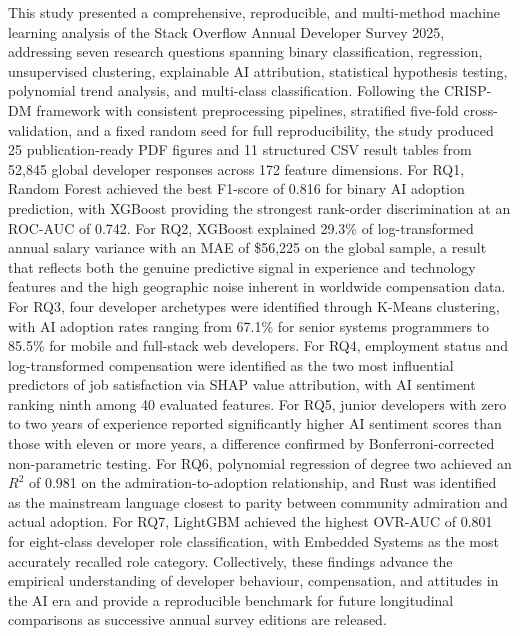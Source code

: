 \documentclass[journal, onecolumn]{IEEEtran}
\begin{document}
This study presented a comprehensive, reproducible, and multi-method machine learning analysis of the Stack Overflow Annual Developer Survey 2025, addressing seven research questions spanning binary classification, regression, unsupervised clustering, explainable AI attribution, statistical hypothesis testing, polynomial trend analysis, and multi-class classification.
Following the CRISP-DM framework with consistent preprocessing pipelines, stratified five-fold cross-validation, and a fixed random seed for full reproducibility, the study produced 25 publication-ready PDF figures and 11 structured CSV result tables from 52,845 global developer responses across 172 feature dimensions.
For RQ1, Random Forest achieved the best F1-score of 0.816 for binary AI adoption prediction, with XGBoost providing the strongest rank-order discrimination at an ROC-AUC of 0.742.
For RQ2, XGBoost explained 29.3\% of log-transformed annual salary variance with an MAE of \$56,225 on the global sample, a result that reflects both the genuine predictive signal in experience and technology features and the high geographic noise inherent in worldwide compensation data.
For RQ3, four developer archetypes were identified through K-Means clustering, with AI adoption rates ranging from 67.1\% for senior systems programmers to 85.5\% for mobile and full-stack web developers.
For RQ4, employment status and log-transformed compensation were identified as the two most influential predictors of job satisfaction via SHAP value attribution, with AI sentiment ranking ninth among 40 evaluated features.
For RQ5, junior developers with zero to two years of experience reported significantly higher AI sentiment scores than those with eleven or more years, a difference confirmed by Bonferroni-corrected non-parametric testing.
For RQ6, polynomial regression of degree two achieved an $R^2$ of 0.981 on the admiration-to-adoption relationship, and Rust was identified as the mainstream language closest to parity between community admiration and actual adoption.
For RQ7, LightGBM achieved the highest OVR-AUC of 0.801 for eight-class developer role classification, with Embedded Systems as the most accurately recalled role category.
Collectively, these findings advance the empirical understanding of developer behaviour, compensation, and attitudes in the AI era and provide a reproducible benchmark for future longitudinal comparisons as successive annual survey editions are released.



\end{document}
